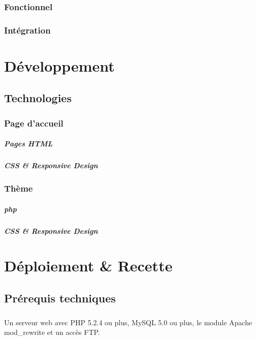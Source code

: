 \documentclass[11pt,a4paper]{report}
\begin{document}
		\subsection{Fonctionnel}
		\subsection{Intégration}

\chapter{Développement}
	\section{Technologies}
		\subsection{Page d'accueil}
			\paragraph{Pages HTML}
			\paragraph{CSS \& Responsive Design}
		\subsection{Thème}
			\paragraph{php}
			\paragraph{CSS \& Responsive Design}

\chapter{Déploiement \& Recette}
	\section{Prérequis techniques}
		\paragraph{}Un serveur web avec PHP 5.2.4 ou plus, MySQL 5.0 ou plus, le module Apache mod\_rewrite et un accès FTP.
\end{document}
